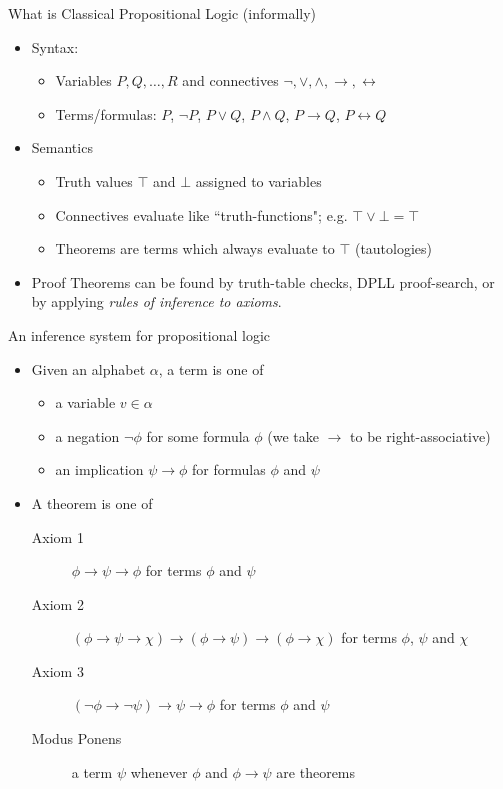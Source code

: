 \documentclass[presentation]{beamer}
\begin{document}
\begin{frame}[label={sec:orgheadline3}]{What is Classical Propositional Logic (informally)}
\begin{itemize}
\item Syntax:
\begin{itemize}
\item Variables \(P, Q, \ldots, R\) and connectives \(\neg, \vee, \wedge, \rightarrow, \leftrightarrow\)
\item Terms/formulas: \(P\), \(\neg P\), \(P \vee Q\), \(P \wedge Q\), \(P \rightarrow Q\), 
\(P \leftrightarrow Q\)
\end{itemize}

\item Semantics
\begin{itemize}
\item Truth values \(\top\) and \(\bot\) assigned to variables
\item Connectives evaluate like ``truth-functions"; e.g. \(\top \vee \bot = \top\)
\item Theorems are terms which always evaluate to \(\top\) (tautologies)
\end{itemize}

\item Proof
Theorems can be found by truth-table checks, DPLL proof-search, or by applying
\emph{rules of inference to axioms}.
\end{itemize}
\end{frame}

\begin{frame}[label={sec:orgheadline4}]{An inference system for propositional logic}
\begin{itemize}
\item Given an alphabet \(\alpha\), a term is one of
\begin{itemize}
\item a variable \(v \in \alpha\)
\item a negation \(\neg\phi\) for some formula \(\phi\) (we take \(\rightarrow\) to be
right-associative)
\item an implication \(\psi \rightarrow \phi\) for formulas \(\phi\) and \(\psi\)
\end{itemize}

\item A theorem is one of
\begin{description}
\item[{Axiom 1}] \(\phi \rightarrow \psi \rightarrow \phi\) for terms \(\phi\) and \(\psi\)
\item[{Axiom 2}] \((\phi \rightarrow \psi \rightarrow \chi) \rightarrow (\phi
       \rightarrow \psi) \rightarrow (\phi \rightarrow \chi)\)
       for terms \(\phi\), \(\psi\) and \(\chi\)
\item[{Axiom 3}] \((\neg \phi \rightarrow \neg \psi) \rightarrow \psi \rightarrow \phi\)
       for terms \(\phi\) and \(\psi\)
\item[{Modus Ponens}] a term \(\psi\) whenever \(\phi\) and \(\phi \rightarrow \psi\) are
theorems
\end{description}
\end{itemize}
\end{frame}
\end{document}
